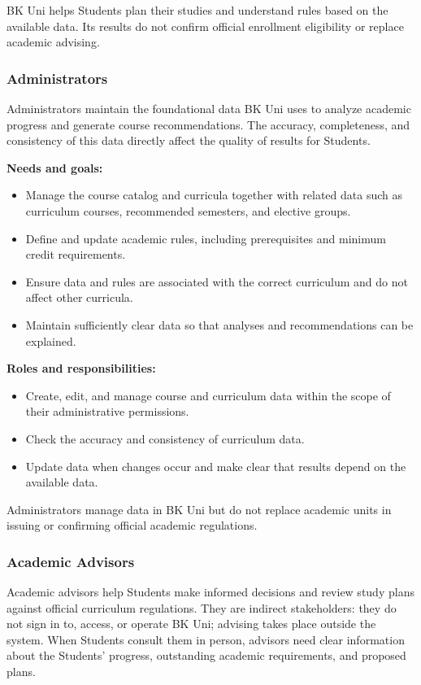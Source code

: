 BK Uni helps Students plan their studies and understand rules based on the available data. Its results do not confirm official enrollment eligibility or replace academic advising.

\subsubsection{Administrators}
Administrators maintain the foundational data BK Uni uses to analyze academic progress and generate course recommendations. The accuracy, completeness, and consistency of this data directly affect the quality of results for Students.

\textbf{Needs and goals:}
\begin{itemize}
    \item Manage the course catalog and curricula together with related data such as curriculum courses, recommended semesters, and elective groups.
    \item Define and update academic rules, including prerequisites and minimum credit requirements.
    \item Ensure data and rules are associated with the correct curriculum and do not affect other curricula.
    \item Maintain sufficiently clear data so that analyses and recommendations can be explained.
\end{itemize}

\textbf{Roles and responsibilities:}
\begin{itemize}
    \item Create, edit, and manage course and curriculum data within the scope of their administrative permissions.
    \item Check the accuracy and consistency of curriculum data.
    \item Update data when changes occur and make clear that results depend on the available data.
\end{itemize}

Administrators manage data in BK Uni but do not replace academic units in issuing or confirming official academic regulations.

\subsubsection{Academic Advisors}
Academic advisors help Students make informed decisions and review study plans against official curriculum regulations. They are indirect stakeholders: they do not sign in to, access, or operate BK Uni; advising takes place outside the system. When Students consult them in person, advisors need clear information about the Students' progress, outstanding academic requirements, and proposed plans.

